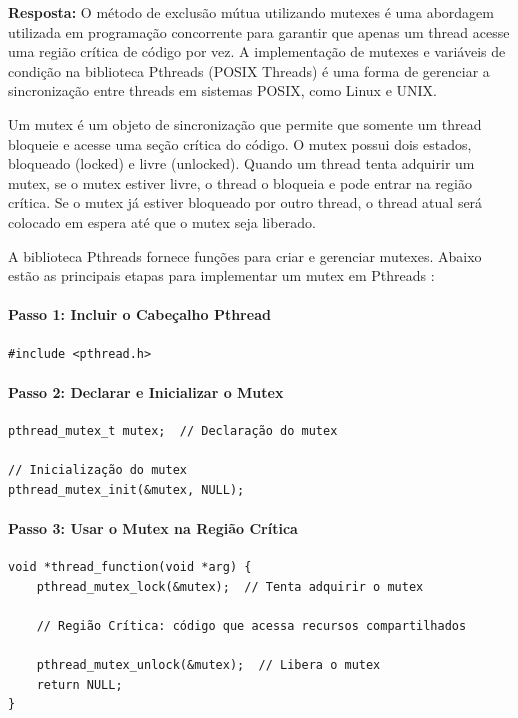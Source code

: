 \documentclass{article}
\begin{document}
\textbf{Resposta:} O método de exclusão mútua utilizando mutexes é uma abordagem utilizada em programação concorrente para garantir que apenas um thread acesse uma região crítica de código por vez. A implementação de mutexes e variáveis de condição na biblioteca Pthreads (POSIX Threads) é uma forma de gerenciar a sincronização entre threads em sistemas POSIX, como Linux e UNIX.

Um mutex é um objeto de sincronização que permite que somente um thread bloqueie e acesse uma seção crítica do código. O mutex possui dois estados, bloqueado (locked) e livre (unlocked). Quando um thread tenta adquirir um mutex, se o mutex estiver livre, o thread o bloqueia e pode entrar na região crítica. Se o mutex já estiver bloqueado por outro thread, o thread atual será colocado em espera até que o mutex seja liberado.

A biblioteca Pthreads fornece funções para criar e gerenciar mutexes. Abaixo estão as principais etapas para implementar um mutex em Pthreads \cite{tanenbaum2021,nona2013}:

\paragraph{Passo 1: Incluir o Cabeçalho Pthread}
\begin{verbatim}
#include <pthread.h>
\end{verbatim}

\paragraph{Passo 2: Declarar e Inicializar o Mutex}
\begin{verbatim}
pthread_mutex_t mutex;  // Declaração do mutex

// Inicialização do mutex
pthread_mutex_init(&mutex, NULL);
\end{verbatim}

\paragraph{Passo 3: Usar o Mutex na Região Crítica}
\begin{verbatim}
void *thread_function(void *arg) {
    pthread_mutex_lock(&mutex);  // Tenta adquirir o mutex

    // Região Crítica: código que acessa recursos compartilhados

    pthread_mutex_unlock(&mutex);  // Libera o mutex
    return NULL;
}
\end{verbatim}
\end{document}
